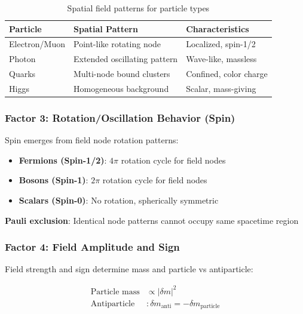 	\begin{table}[htbp]
		\centering
		\begin{tabular}{lp{5cm}p{4cm}}
			\toprule
			\textbf{Particle} & \textbf{Spatial Pattern} & \textbf{Characteristics} \\
			\midrule
			Electron/Muon & Point-like rotating node & Localized, spin-1/2 \\
			Photon & Extended oscillating pattern & Wave-like, massless \\
			Quarks & Multi-node bound clusters & Confined, color charge \\
			Higgs & Homogeneous background & Scalar, mass-giving \\
			\bottomrule
		\end{tabular}
		\caption{Spatial field patterns for particle types}
		\label{tab:spatial_field_patterns}
	\end{table}
	
	\subsubsection{Factor 3: Rotation/Oscillation Behavior (Spin)}
	\label{subsubsec:spin_behavior}
	
	Spin emerges from field node rotation patterns:
	
	\begin{tcolorbox}[colback=green!5!white,colframe=green!75!black,title=Spin from Field Node Rotation]
		\begin{itemize}
			\item \textbf{Fermions (Spin-1/2)}: $4\pi$ rotation cycle for field nodes
			\item \textbf{Bosons (Spin-1)}: $2\pi$ rotation cycle for field nodes
			\item \textbf{Scalars (Spin-0)}: No rotation, spherically symmetric
		\end{itemize}
		
		\textbf{Pauli exclusion}: Identical node patterns cannot occupy same spacetime region
	\end{tcolorbox}
	
	\subsubsection{Factor 4: Field Amplitude and Sign}
	\label{subsubsec:field_amplitude}
	
	Field strength and sign determine mass and particle vs antiparticle:
	
	\begin{align}
		\text{Particle mass} &\propto |\delta m|^2 \\
		\text{Antiparticle} &: \delta m_{\text{anti}} = -\delta m_{\text{particle}}
	\end{align}
	
